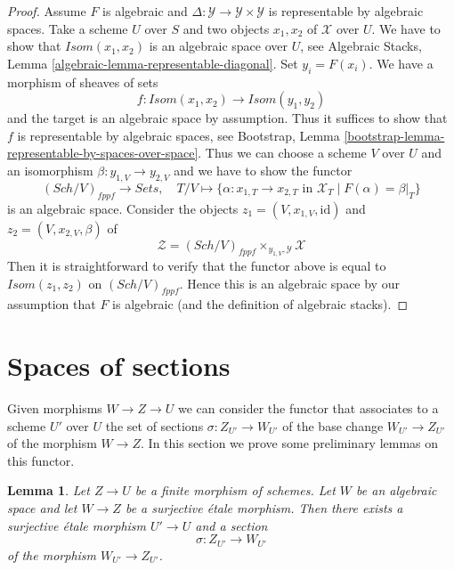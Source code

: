\documentclass{stacks-project}
\theoremstyle{plain}
\newtheorem{lemma}[subsection]{Lemma}
\theoremstyle{definition}
\theoremstyle{remark}
\numberwithin{equation}{subsection}
\def\Sch{\mathit{Sch}}
\begin{document}
\begin{proof}
Assume $F$ is algebraic and
$\Delta : \mathcal{Y} \to \mathcal{Y} \times \mathcal{Y}$
is representable by algebraic spaces.
Take a scheme $U$ over $S$ and two objects $x_1, x_2$ of
$\mathcal{X}$ over $U$.
We have to show that $\mathit{Isom}(x_1, x_2)$ is an algebraic space
over $U$, see
Algebraic Stacks, Lemma \ref{algebraic-lemma-representable-diagonal}.
Set $y_i = F(x_i)$. We have a morphism of sheaves of sets
$$
f : \mathit{Isom}(x_1, x_2) \to \mathit{Isom}(y_1, y_2)
$$
and the target is an algebraic space by assumption.
Thus it suffices to show that $f$ is representable by
algebraic spaces, see Bootstrap, Lemma
\ref{bootstrap-lemma-representable-by-spaces-over-space}.
Thus we can choose a scheme $V$ over $U$ and an
isomorphism $\beta : y_{1, V} \to y_{2, V}$ and
we have to show the functor
$$
(\Sch/V)_{fppf} \to \textit{Sets},\quad
T/V \mapsto \{\alpha : x_{1, T} \to x_{2, T}
\text{ in }\mathcal{X}_T \mid F(\alpha) = \beta|_T\}
$$
is an algebraic space. Consider the objects
$z_1 = (V, x_{1, V}, \text{id})$ and 
$z_2 = (V, x_{2, V}, \beta)$ of
$$
\mathcal{Z} = (\Sch/V)_{fppf} \times_{y_{1, V}, \mathcal{Y}} \mathcal{X}
$$
Then it is straightforward to verify that
the functor above is equal to $\mathit{Isom}(z_1, z_2)$
on $(\Sch/V)_{fppf}$. Hence this is an algebraic space
by our assumption that $F$ is algebraic (and the definition
of algebraic stacks).
\end{proof}
















\section{Spaces of sections}
\label{section-spaces-sections}

\noindent
Given morphisms $W \to Z \to U$ we can consider the functor that associates
to a scheme $U'$ over $U$ the set of sections $\sigma : Z_{U'} \to W_{U'}$
of the base change $W_{U'} \to Z_{U'}$ of the morphism $W \to Z$.
In this section we prove some preliminary lemmas on this functor.

\begin{lemma}
\label{lemma-surjection-space-of-sections}
Let $Z \to U$ be a finite morphism of schemes.
Let $W$ be an algebraic space and let $W \to Z$ be a
surjective \'etale morphism. Then there exists a surjective
\'etale morphism $U' \to U$ and a section
$$
\sigma : Z_{U'} \to W_{U'}
$$
of the morphism $W_{U'} \to Z_{U'}$.
\end{lemma}
\end{document}
